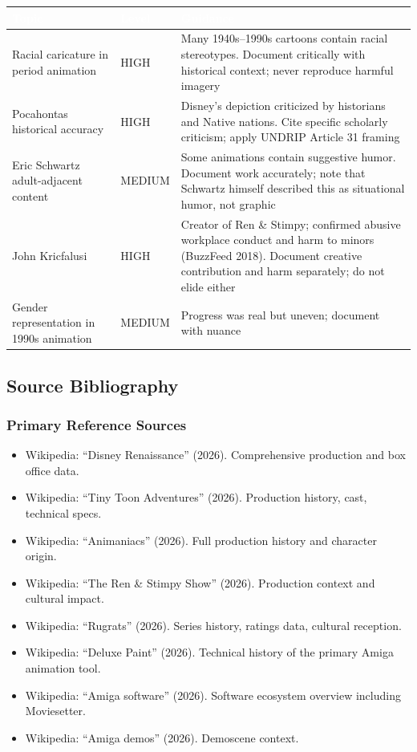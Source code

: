\documentclass[11pt,letterpaper]{article}
\newcommand{\tableheader}[1]{\textbf{\sffamily\textcolor{white}{#1}}}
\begin{document}
\begin{center}
\begin{tabularx}{\textwidth}{L{3cm}L{2cm}X}
\toprule
{}
\tableheader{Topic} & \tableheader{Level} & \tableheader{Guidance} \\
\midrule
Racial caricature in period animation & HIGH & Many 1940s--1990s cartoons contain racial stereotypes. Document critically with historical context; never reproduce harmful imagery \\
Pocahontas historical accuracy & HIGH & Disney's depiction criticized by historians and Native nations. Cite specific scholarly criticism; apply UNDRIP Article 31 framing \\
Eric Schwartz adult-adjacent content & MEDIUM & Some animations contain suggestive humor. Document work accurately; note that Schwartz himself described this as situational humor, not graphic \\
John Kricfalusi & HIGH & Creator of Ren \& Stimpy; confirmed abusive workplace conduct and harm to minors (BuzzFeed 2018). Document creative contribution and harm separately; do not elide either \\
Gender representation in 1990s animation & MEDIUM & Progress was real but uneven; document with nuance \\
\bottomrule
\end{tabularx}
\end{center}

\subsection{Source Bibliography}

\subsubsection{Primary Reference Sources}

\begin{itemize}[leftmargin=2em]
  \item Wikipedia: ``Disney Renaissance'' (2026). Comprehensive production and box office data.
  \item Wikipedia: ``Tiny Toon Adventures'' (2026). Production history, cast, technical specs.
  \item Wikipedia: ``Animaniacs'' (2026). Full production history and character origin.
  \item Wikipedia: ``The Ren \& Stimpy Show'' (2026). Production context and cultural impact.
  \item Wikipedia: ``Rugrats'' (2026). Series history, ratings data, cultural reception.
  \item Wikipedia: ``Deluxe Paint'' (2026). Technical history of the primary Amiga animation tool.
  \item Wikipedia: ``Amiga software'' (2026). Software ecosystem overview including Moviesetter.
  \item Wikipedia: ``Amiga demos'' (2026). Demoscene context.
\end{itemize}
\end{document}
